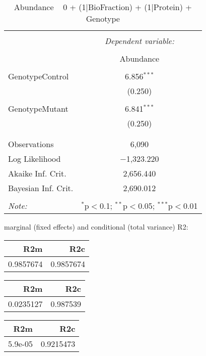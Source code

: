 \documentclass[11pt]{report}
\begin{document}
\begin{table}[!htbp] \centering 
  \caption{Abundance ~ 0 + (1|BioFraction) + (1|Protein) + Genotype} 
  \label{} 
\begin{tabular}{@{\extracolsep{5pt}}lc} 
\\[-1.8ex]\hline 
\hline \\[-1.8ex] 
 & \multicolumn{1}{c}{\textit{Dependent variable:}} \\ 
\cline{2-2} 
\\[-1.8ex] & Abundance \\ 
\hline \\[-1.8ex] 
 GenotypeControl & 6.856$^{***}$ \\ 
  & (0.250) \\ 
  & \\ 
 GenotypeMutant & 6.841$^{***}$ \\ 
  & (0.250) \\ 
  & \\ 
\hline \\[-1.8ex] 
Observations & 6,090 \\ 
Log Likelihood & $-$1,323.220 \\ 
Akaike Inf. Crit. & 2,656.440 \\ 
Bayesian Inf. Crit. & 2,690.012 \\ 
\hline 
\hline \\[-1.8ex] 
\textit{Note:}  & \multicolumn{1}{r}{$^{*}$p$<$0.1; $^{**}$p$<$0.05; $^{***}$p$<$0.01} \\ 
\end{tabular} 
\end{table} 
marginal (fixed effects) and conditional (total variance) R2:

\begin{tabular}{r|r}
\hline
R2m & R2c\\
\hline
0.9857674 & 0.9857674\\
\hline
\end{tabular}

\begin{tabular}{r|r}
\hline
R2m & R2c\\
\hline
0.0235127 & 0.987539\\
\hline
\end{tabular}

\begin{tabular}{r|r}
\hline
R2m & R2c\\
\hline
5.9e-05 & 0.9215473\\
\hline
\end{tabular}
\end{document}
